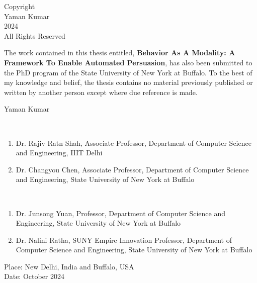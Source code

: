 \newpage

\setcounter{page}{2}

\vspace*{\fill}
\begin{center}
  {\large Copyright} \\
  \vspace{0.5cm}
  {\large Yaman Kumar} \\
  \vspace{0.5cm}
  {\large 2024} \\
  \vspace{0.5cm}
  {\large All Rights Reserved}
\end{center}
\vspace*{\fill}

\newpage

\certificate
\noindent The work contained in this thesis entitled, \textbf{Behavior As A Modality: A Framework To Enable Automated Persuasion}, has also been submitted to the PhD program of the State University of New York at Buffalo. To the best of my knowledge and belief, the thesis contains no material previously published or written by another person except where due reference is made.

\vspace*{0.5in}

\noindent Yaman Kumar

\vspace*{1in}

\begin{singlespacing}
{ \\
\begin{enumerate}
    \item Dr. Rajiv Ratn Shah, Associate Professor, Department of Computer Science and Engineering, IIIT Delhi
    \item Dr. Changyou Chen, Associate Professor, Department of Computer Science and Engineering, State University of New York at Buffalo
\end{enumerate}

 \\
\begin{enumerate}
    \item Dr. Junsong Yuan, Professor, Department of Computer Science and Engineering, State University of New York at Buffalo
    \item Dr. Nalini Ratha, SUNY Empire Innovation Professor, Department of Computer Science and Engineering, State University of New York at Buffalo
\end{enumerate}

\noindent Place: New Delhi, India and Buffalo, USA \\
\noindent Date: October 2024
}
\end{singlespacing}


